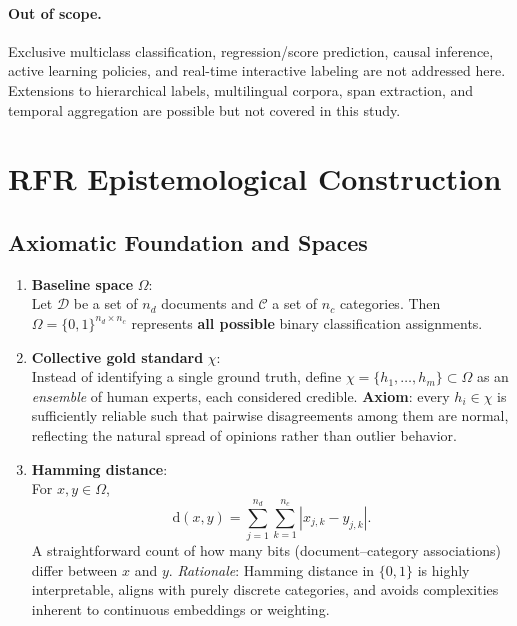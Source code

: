 \documentclass[12pt]{article}
\begin{document}
\paragraph{Out of scope.}
Exclusive multiclass classification, regression/score prediction, causal inference, active learning policies, and real-time interactive labeling are not addressed here. Extensions to hierarchical labels, multilingual corpora, span extraction, and temporal aggregation are possible but not covered in this study.


\section{RFR Epistemological Construction}\label{sec:methods}
\subsection{Axiomatic Foundation and Spaces}
\begin{enumerate}
\item \textbf{Baseline space} $\Omega$: \\
   Let $\mathcal{D}$ be a set of $n_d$ documents and $\mathcal{C}$ a set of $n_c$ categories. Then $\Omega = \{0,1\}^{n_d \times n_c}$ represents \textbf{all possible} binary classification assignments.
\item \textbf{Collective gold standard} $\chi$: \\
   Instead of identifying a single ground truth, define $\chi = \{h_1,\dots,h_m\}\subset\Omega$ as an \textit{ensemble} of human experts, each considered credible. \newline \textbf{Axiom}: every $h_i\in\chi$ is sufficiently reliable such that pairwise disagreements among them are normal, reflecting the natural spread of opinions rather than outlier behavior.
\item \textbf{Hamming distance}: \\
   For $x,y\in\Omega$,\\
   \begin{equation}
   \mathrm{d}(x,y) = \sum_{j=1}^{n_d} \sum_{k=1}^{n_c} |x_{j,k}-y_{j,k}|.
   \end{equation}
   A straightforward count of how many bits (document--category associations) differ between $x$ and $y$. \newline \textit{Rationale}: Hamming distance in $\{0,1\}$ is highly interpretable, aligns with purely discrete categories, and avoids complexities inherent to continuous embeddings or weighting.
\end{enumerate}
\end{document}
